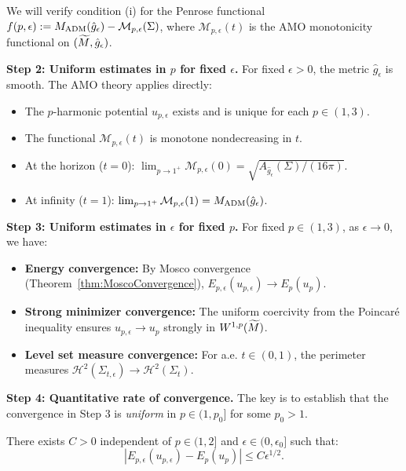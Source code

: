 We will verify condition (i) for the Penrose functional $f(p, \epsilon) := M_{\mathrm{ADM}}(\hat{g}_\epsilon) - \mathcal{M}_{p,\epsilon}(\Sigma)$, where $\mathcal{M}_{p,\epsilon}(t)$ is the AMO monotonicity functional on $(\widetilde{M}, \hat{g}_\epsilon)$.

\textbf{Step 2: Uniform estimates in $p$ for fixed $\epsilon$.}
For fixed $\epsilon > 0$, the metric $\hat{g}_\epsilon$ is smooth. The AMO theory applies directly:
\begin{itemize}
    \item The $p$-harmonic potential $u_{p,\epsilon}$ exists and is unique for each $p \in (1, 3)$.
    \item The functional $\mathcal{M}_{p,\epsilon}(t)$ is monotone nondecreasing in $t$.
    \item At the horizon ($t = 0$): $\lim_{p \to 1^+} \mathcal{M}_{p,\epsilon}(0) = \sqrt{A_{\hat{g}_\epsilon}(\Sigma)/(16\pi)}$.
    \item At infinity ($t = 1$): $\lim_{p \to 1^+} \mathcal{M}_{p,\epsilon}(1) = M_{\mathrm{ADM}}(\hat{g}_\epsilon)$.
\end{itemize}

\textbf{Step 3: Uniform estimates in $\epsilon$ for fixed $p$.}
For fixed $p \in (1, 3)$, as $\epsilon \to 0$, we have:
\begin{itemize}
    \item \textbf{Energy convergence:} By Mosco convergence (Theorem~\ref{thm:MoscoConvergence}), $E_{p,\epsilon}(u_{p,\epsilon}) \to E_p(u_p)$.
    \item \textbf{Strong minimizer convergence:} The uniform coercivity from the Poincar\'e inequality ensures $u_{p,\epsilon} \to u_p$ strongly in $W^{1,p}(\widetilde{M})$.
    \item \textbf{Level set measure convergence:} For a.e. $t \in (0,1)$, the perimeter measures $\mathcal{H}^2(\Sigma_{t,\epsilon}) \to \mathcal{H}^2(\Sigma_t)$.
\end{itemize}

\textbf{Step 4: Quantitative rate of convergence.}
The key is to establish that the convergence in Step 3 is \emph{uniform} in $p \in (1, p_0]$ for some $p_0 > 1$.

\begin{proposition}\label{prop:UniformEpsilonBound}
There exists $C > 0$ independent of $p \in (1, 2]$ and $\epsilon \in (0, \epsilon_0]$ such that:
\begin{equation}\label{eq:UniformRate}
    |E_{p,\epsilon}(u_{p,\epsilon}) - E_p(u_p)| \le C \epsilon^{1/2}.
\end{equation}
\end{proposition}

